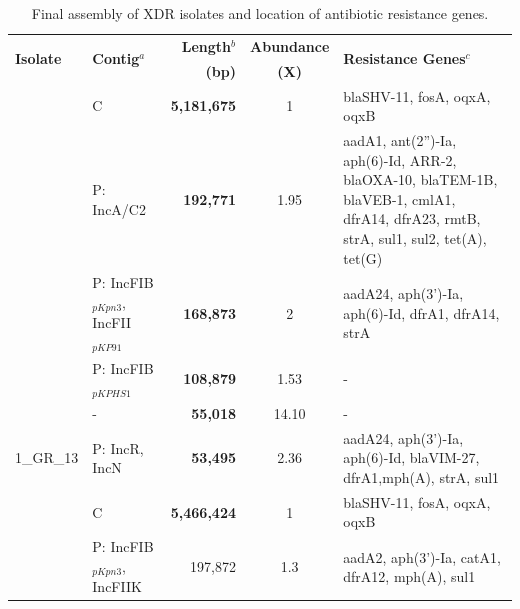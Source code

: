 \begin{landscape}
\begin{table}[!ht]
\centering
\scriptsize
\caption{Final assembly of XDR \kp{} isolates and location of antibiotic resistance genes.}
\label{tab:assers_final}
\begin{tabular}{llrcp{12cm}}
\hline
\toprule
\multirow{2}{*}{\small \textbf{Isolate}}  & \multirow{2}{*}{\small \textbf{Contig}$^a$}   & {\small \textbf{Length}$^b$} & {\small \textbf{Abundance}} & \multirow{2}{*}{\small \textbf{Resistance Genes}$^c$}\\
 & & \textbf{(bp)} & \textbf{(X)} & \\ 
\hline
\rowcolor{Gray}
 \cellcolor{white}  		& C                           & \textbf{5,181,675}     & 1        & blaSHV-11, fosA, oqxA, oqxB                                                                                                                \\
                            & P: IncA/C2                  & \textbf{192,771}      & 1.95     & aadA1, ant(2'')-Ia, aph(6)-Id, ARR-2, blaOXA-10, blaTEM-1B, blaVEB-1, cmlA1, dfrA14, dfrA23, rmtB, strA, sul1, sul2, tet(A), tet(G)        \\ 
\rowcolor{Gray}
 \cellcolor{white}          & P: IncFIB$_{pKpn3}$, IncFII$_{pKP91}$ & \textbf{168,873}      & 2        & aadA24, aph(3')-Ia, aph(6)-Id, dfrA1, dfrA14, strA  \\
                            & P: IncFIB$_{pKPHS1}$             & \textbf{108,879}      & 1.53     & -                                                                                                                                          \\
\rowcolor{Gray}
 \cellcolor{white}          & -                           & \textbf{55,018}       & 14.10    & -                                                                                                                                          \\
\multirow{-6}{*}{1\_GR\_13}    & P: IncR, IncN               & \textbf{53,495}       & 2.36     & aadA24, aph(3')-Ia, aph(6)-Id, blaVIM-27, dfrA1,mph(A), strA, sul1  \\ \hline
\rowcolor{Gray}
 \cellcolor{white}  & C                           & \textbf{5,466,424}     & 1        & blaSHV-11, fosA, oqxA, oqxB                                                                                                                \\
                            & P: IncFIB$_{pKpn3}$, IncFIIK     & 197,872      & 1.3      & aadA2, aph(3')-Ia, catA1, dfrA12, mph(A), sul1                                                                                             \\ 

\end{tabular}
\end{table}
\end{landscape}
